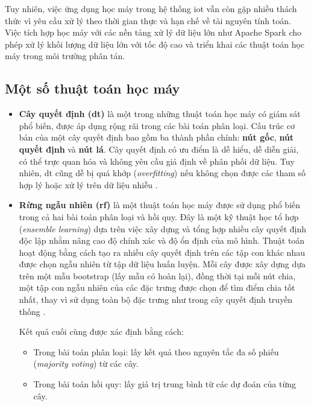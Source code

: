 Tuy nhiên, việc ứng dụng học máy trong hệ thống \ac{iot} vẫn còn gặp nhiều thách thức vì yêu cầu xử lý theo thời gian thực và hạn chế về tài nguyên tính toán. Việc tích hợp học máy với các nền tảng xử lý dữ liệu lớn như Apache Spark cho phép xử lý khối lượng dữ liệu lớn với tốc độ cao và triển khai các thuật toán học máy trong môi trường phân tán.
\subsection{Một số thuật toán học máy}
\begin{itemize}
\item \textbf{Cây quyết định (\ac{dt})} là một trong những thuật toán học máy có giám sát phổ biến, được áp dụng rộng rãi trong các bài toán phân loại. Cấu trúc cơ bản của một cây quyết định bao gồm ba thành phần chính: \textbf{nút gốc}, \textbf{nút quyết định} và \textbf{nút lá}.
Cây quyết định có ưu điểm là dễ hiểu, dễ diễn giải, có thể trực quan hóa và không yêu cầu giả định về phân phối dữ liệu. Tuy nhiên, \ac{dt} cũng dễ bị quá khớp (\textit{overfitting}) nếu không chọn được các tham số hợp lý hoặc xử lý trên dữ liệu nhiễu \cite{mitchell1997machine}.

\item \textbf{Rừng ngẫu nhiên (\ac{rf})} là một thuật toán học máy được sử dụng phổ biến trong cả hai bài toán phân loại và hồi quy. Đây là một kỹ thuật học tổ hợp (\textit{ensemble learning}) dựa trên việc xây dựng và tổng hợp nhiều cây quyết định độc lập nhằm nâng cao độ chính xác và độ ổn định của mô hình. Thuật toán hoạt động bằng cách tạo ra nhiều cây quyết định trên các tập con khác nhau được chọn ngẫu nhiên từ tập dữ liệu huấn luyện. Mỗi cây được xây dựng dựa trên một mẫu bootstrap (lấy mẫu có hoàn lại), đồng thời tại mỗi nút chia, một tập con ngẫu nhiên của các đặc trưng được chọn để tìm điểm chia tốt nhất, thay vì sử dụng toàn bộ đặc trưng như trong cây quyết định truyền thống \cite{breiman2001random}.

Kết quả cuối cùng được xác định bằng cách:  
\begin{itemize}
    \item Trong bài toán phân loại: lấy kết quả theo nguyên tắc đa số phiếu (\textit{majority voting}) từ các cây.  
    \item Trong bài toán hồi quy: lấy giá trị trung bình từ các dự đoán của từng cây.
\end{itemize}


\end{itemize}
